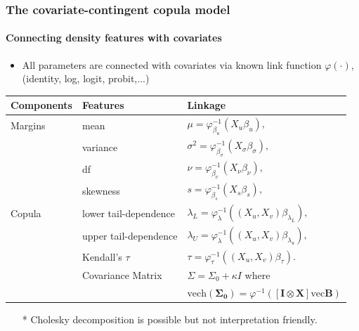 \documentclass{beamer}
\begin{document}
\begin{frame}%
  \frametitle{The covariate-contingent copula model}
  \framesubtitle{Connecting density features with covariates}

  \begin{itemize}
  \item All parameters are connected with covariates via known link function
    $\varphi(\cdot)$, (identity, log, logit, probit,...)
  \end{itemize}
    \begin{center}
      \begin{tabular}{lll}
        \toprule
      Components & Features & Linkage\\
        \midrule
        \small{Margins}&mean&$\mu = \varphi_{\beta_u}^{-1}(X_u\beta_u),$\\
                 &variance&$\sigma^2 = \varphi_{\beta_\sigma}^{-1}(X_\sigma\beta_\sigma),$ \\
                 &df&$\nu = \varphi_{\beta_\nu}^{-1}(X_\nu\beta_\nu),$\\
                 &skewness&$s = \varphi_{\beta_s}^{-1}(X_s\beta_s),$\\
        \small{Copula} &lower tail-dependence&$\lambda_L = \varphi_{\lambda}^{-1}((X_u,X_v)\beta_{\lambda_L}),$\\
                 &upper tail-dependence&$\lambda_U = \varphi_{\lambda}^{-1}((X_u,X_v)\beta_{\lambda_u}),$\\
                 &Kendall's $\tau$& $\tau=\varphi_{\tau}^{-1}((X_u,X_v)\beta_\tau).$\\
                 &Covariance Matrix\color{blue}{*}& $\Sigma=\Sigma_0 + \kappa I$ where\\
                 &&\hspace{0.4cm}$\mathrm{vech}(\bm{\Sigma_0}) = \varphi^{-1}([\bm{I}\otimes \bm{X}]\mathrm{vec}\bm{B})$\\
        \bottomrule
      \end{tabular}
      \begin{itemize}
      \item [*] \small{Cholesky decomposition {\color{blue}\citep{huang2007estimation}} is
          possible but not interpretation friendly.}
      \end{itemize}
    \end{center}


      \begin{align*}
      \end{align*}

    \end{frame}
\end{document}
